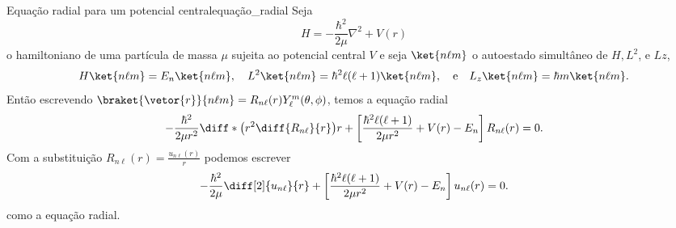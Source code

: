\begin{lemma}{Equação radial para um potencial central}{equação_radial}
    Seja
    \begin{equation*}
        H = -\frac{\hbar^2}{2\mu} \nabla^2 + V(r)
    \end{equation*}
    o hamiltoniano de uma partícula de massa \(\mu\) sujeita ao potencial central \(V\) e seja \(\ket{n\ell m}\) o autoestado simultâneo de \(H, {L}^2\), e \(Lz\),
    \begin{equation*}
        H\ket{n\ell m} = E_n\ket{n\ell m},\quad
        L^2\ket{n\ell m} = \hbar^2\ell(\ell+1)\ket{n\ell m},\quad\text{e}\quad
        L_z\ket{n\ell m} = \hbar m\ket{n\ell m}.
    \end{equation*}
    Então escrevendo \(\braket{\vetor{r}}{n\ell m} = R_{n\ell}(r) Y_{\ell}^m(\theta,\phi)\), temos a equação radial
    \begin{equation*}
        -\frac{\hbar^2}{2\mu r^2}\diff*{\left(r^2 \diff{R_{n\ell}}{r}\right)}{r} + \left[\frac{\hbar^2\ell(\ell+1)}{2\mu r^2} + V(r) - E_n\right]R_{n\ell}(r) = 0.
    \end{equation*}
    Com a substituição \(R_{n\ell}(r) = \frac{u_{n\ell}(r)}{r}\) podemos escrever
    \begin{equation*}
        -\frac{\hbar^2}{2\mu}\diff[2]{u_{n\ell}}{r} + \left[\frac{\hbar^2\ell(\ell+1)}{2\mu r^2} + V(r) - E_n\right]u_{n\ell}(r) = 0.
    \end{equation*}
    como a equação radial.
\end{lemma}
